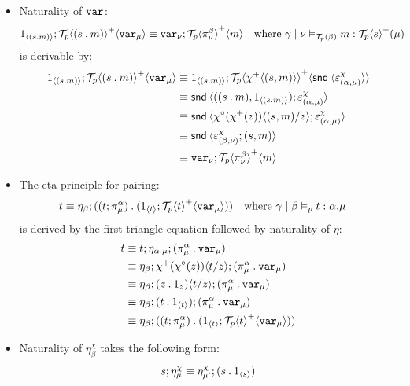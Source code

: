 \documentclass[10pt]{article}
\theoremstyle{definition}
\newcommand\dsd[1]{\ensuremath{\mathsf{#1}}}
\newcommand{\app}[2]{\ensuremath{#1 \: #2}}
\newcommand{\snd}[1]{\app{\dsd{snd}}{#1}}
\newcommand\TermTwoT[5]{\ensuremath{#1 \mid #3 \vDash_{#5} {#2} : #4}}
\newcommand\TrPlus[2]{\ensuremath{{#1}^+(#2)}}
\newcommand\TrCirc[2]{\ensuremath{{#1}^\circ(#2)}}
\newcommand\El[2]{\mathcal{T}_{#1}(#2)}
\newcommand\ApEl[2]{\mathcal{T}_{#1}\langle#2\rangle}
\newcommand\bdot[0]{\mathbin{.}}
\newcommand\ap[2]{\ensuremath{#1 \langle #2 \rangle }}
\newcommand\ApPlus[2]{\ensuremath{{#1}^+ \langle #2 \rangle }}
\begin{document}
\begin{itemize}
\item Naturality of $\mathtt{var}_{}$:
\begin{align}
\label{beta-var}
\ApOne{(s \bdot m)};\ApPlus{\ApEl{p}{(s \bdot m)}}{\var{\mu}} &\equiv \var{\nu};\ApPlus{\ApEl{p}{\pi^\beta_\nu}}{m}  && \text{where } \TermTwoT{\gamma}{m}{\nu}{\TrPlus{\ApEl{p}{s}}{\mu}}{\El{p}{\beta}}
\end{align}
is derivable by:
\begin{align*}
\ApOne{(s \bdot m)};\ApPlus{\ApEl{p}{(s \bdot m)}}{\var{\mu}} 
&\equiv \ApOne{(s \bdot m)};\ApPlus{\ApEl{p}{\ApPlus{\chi}{(s, m)}}}{\ap \snd {\varepsilon^\chi_{(\alpha, \mu)}}} \\
&\equiv \ap \snd {((s \bdot m), \ApOne{(s \bdot m)});\varepsilon^\chi_{(\alpha, \mu)}} \\
&\equiv \ap \snd {\ap{\TrCirc{\chi}{\TrPlus{\chi}{z}}}{(s, m)/z};\varepsilon^\chi_{(\alpha, \mu)}} \\
&\equiv \ap \snd {\varepsilon^\chi_{(\beta, \nu)};(s, m)} \\
&\equiv \var{\nu}; \ApPlus{\ApEl{p}{\pi^\beta_{\nu}}}{m} 
\end{align*}

\item The eta principle for pairing:
\begin{align}
\label{eta-pi-var}
t &\equiv \eta_\beta;((t;\pi_\mu^\alpha) \bdot (\ApOne{t}; \ApPlus{\ApEl{p}{t}}{\var{\mu}})) && \text{where } \TermTwoT{\gamma}{t}{\beta}{\alpha.\mu}{p}
\end{align}
is derived by the first triangle equation followed by naturality of $\eta$:
\begin{align*}
t &\equiv t;\eta_{\alpha.\mu};(\pi_\mu^\alpha \bdot \var{\mu}) \\
&\equiv \eta_\beta;\ap{\TrPlus{\chi}{\TrCirc{\chi}{z}}}{t/z};(\pi_\mu^\alpha \bdot \var{\mu}) \\
&\equiv \eta_\beta;\ap{(z \bdot 1_z)}{t/z};(\pi_\mu^\alpha \bdot \var{\mu}) \\
&\equiv \eta_\beta;(t \bdot \ApOne{t});(\pi_\mu^\alpha \bdot \var{\mu}) \\
&\equiv \eta_\beta;((t;\pi_\mu^\alpha) \bdot (\ApOne{t}; \ApPlus{\ApEl{p}{t}}{\var{\mu}})) \\
\end{align*}

\item Naturality of $\eta^\chi_\beta$ takes the following form:
\begin{align*}
s;\eta^\chi_\mu \equiv \eta^\chi_{\mu'} ; (s \bdot \ApOne{s})
\end{align*}

\end{itemize}
\end{document}
